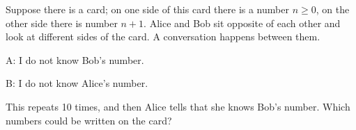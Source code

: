 Suppose there is a card; on one side of this card there is a number $n \geq 0$, on the other side there
is number $n + 1$. Alice and Bob sit opposite of each other and look at different sides of the card. A
conversation happens between them.
\begin{itemtask}
    \item[A:] I do not know Bob’s number.
    \item[B:] I do not know Alice’s number.
\end{itemtask}
This repeats 10 times, and then Alice tells that she knows Bob’s number. Which numbers could be written
on the card?
